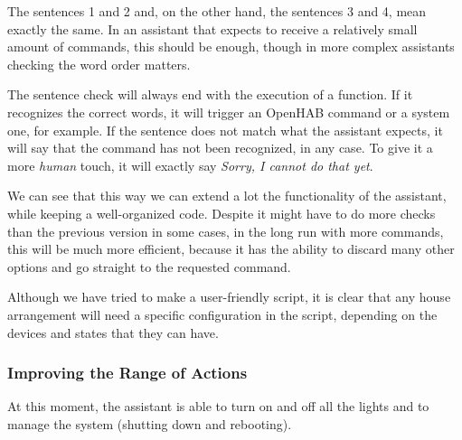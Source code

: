 The sentences 1 and 2 and, on the other hand, the sentences 3 and 4, mean exactly the same. In an assistant that expects to receive
a relatively small amount of commands, this should be enough, though in more complex assistants checking the word order matters.

The sentence check will always end with the execution of a function. If it recognizes the correct words, it will trigger an OpenHAB
command or a system one, for example. If the sentence does not match what the assistant expects, it will say that the command has
not been recognized, in any case. To give it a more \textit{human} touch, it will exactly say \textit{Sorry, I cannot do that yet}.

We can see that this way we can extend a lot the functionality of the assistant, while keeping a well-organized code. Despite it
might have to do more checks than the previous version in some cases, in the long run with more commands, this will be
much more efficient, because it has the ability to discard many other options and go straight to the requested command.

Although we have tried to make a user-friendly script, it is clear that any house arrangement will need a specific configuration in
the script, depending on the devices and states that they can have.

\subsubsection{Improving the Range of Actions}
At this moment, the assistant is able to turn on and off all the lights and to manage the system (shutting down and rebooting).

